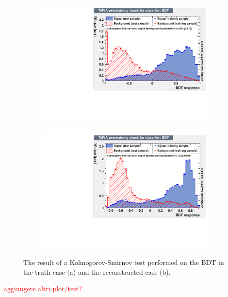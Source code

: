 \documentclass[10pt,a4paper]{book}
\newcommand\todo[1]{\textcolor{red}{#1}}
\begin{document}
\begin{figure}[h]
\begin{subfigure}{1.0\textwidth}
\centering
\includegraphics[scale=0.7]{ch4_images/BDT_overtraining_truth}
\caption{}
\end{subfigure}
\begin{subfigure}{1.0\textwidth}
\centering
\includegraphics[scale=0.7]{ch4_images/BDT_overtraining_reco}
\caption{}
\end{subfigure}
\caption{The result of a Kolmogorov-Smirnov test performed on the BDT in the truth case (a) and the reconstructed case (b).}
\label{kolmogorov smirnov bdt}
\end{figure} 



\todo{aggiungere altri plot/test?}
\end{document}
